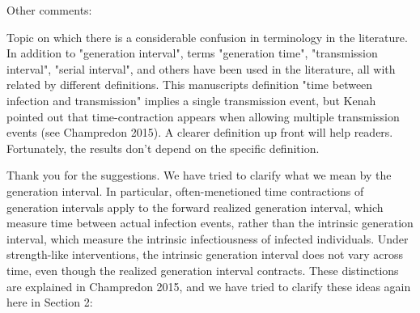 \documentclass[12pt]{article}
\newcommand{\revtext}{\textsf}
\begin{document}
\revtext{Other comments:}

\revtext{Topic on which there is a considerable confusion in terminology in the literature.  In addition to "generation interval", terms "generation time", "transmission interval", "serial interval", and others have been used in the literature, all with related by different definitions.  This manuscripts definition "time between infection and transmission" implies a single transmission event, but Kenah pointed out that time-contraction appears when allowing multiple transmission events (see Champredon 2015).  A clearer definition up front will help readers.  Fortunately, the results don't depend on the specific definition.}

Thank you for the suggestions. We have tried to clarify what we mean by the generation interval. In particular, often-menetioned time contractions of generation intervals apply to the forward realized generation interval, which measure time between actual infection events, rather than the intrinsic generation interval, which measure the intrinsic infectiousness of infected individuals. Under strength-like interventions, the intrinsic generation interval does not vary across time, even though the realized generation interval contracts. These distinctions are explained in Champredon 2015, and we have tried to clarify these ideas again here in Section 2:
\end{document}
